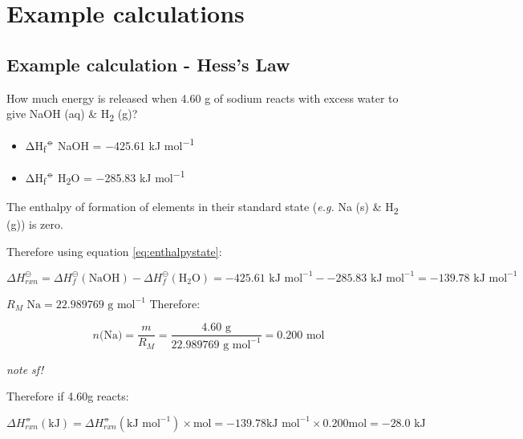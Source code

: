 \documentclass[
]{book}
\providecommand{\tightlist}{%
  \setlength{\itemsep}{0pt}\setlength{\parskip}{0pt}}
\begin{document}
\hypertarget{example-calculations}{%
\section{Example calculations}\label{example-calculations}}

\hypertarget{sec:examplehess}{%
\subsection{Example calculation - Hess's Law}\label{sec:examplehess}}

How much energy is released when 4.60 g of sodium reacts with excess water to give NaOH (aq) \& H\textsubscript{2} (g)?

\begin{itemize}
\tightlist
\item
  ΔH\textsubscript{f}\textsuperscript{⦵} NaOH = −425.61 kJ mol\textsuperscript{−1}
\item
  ΔH\textsubscript{f}\textsuperscript{⦵} H\textsubscript{2}O = −285.83 kJ mol\textsuperscript{−1}
\end{itemize}

The enthalpy of formation of elements in their standard state (\emph{e.g.} Na (s) \& H\textsubscript{2} (g)) is zero.

Therefore using equation \eqref{eq:enthalpystate}:

\begin{equation*}
\Delta H_{rxn}^{\ominus}= \Delta H_{f}^{\ominus}(\textrm{NaOH})-\Delta H_{f}^{\ominus}(\textrm{H}_2\textrm{O})= −425.61 \textrm{ kJ mol}^{−1} − −285.83 \textrm{ kJ mol}^{−1} = −139.78 \textrm{ kJ mol}^{−1}
\end{equation*}

\(R_M \textrm{ Na} = 22.989769 \textrm{ g mol}^{−1}\)
Therefore:

\begin{equation*}
n \textrm{(Na)} = \frac{m}{R_M} = \frac{4.60 \textrm{ g}}{ 22.989769 \textrm{ g mol}^{−1}} = 0.200 \textrm{ mol}
\end{equation*}

\emph{note sf!}

Therefore if 4.60g reacts:

\begin{equation*}
\Delta H_{rxn}^⦵ ( \textrm{kJ}) = \Delta H_{rxn}^⦵ ( \textrm{kJ mol}^{−1}) × \textrm{mol} = −139.78 \textrm{kJ mol}^{-1} × 0.200 \textrm{mol} = −28.0 \textrm{ kJ}
\end{equation*}
\end{document}
